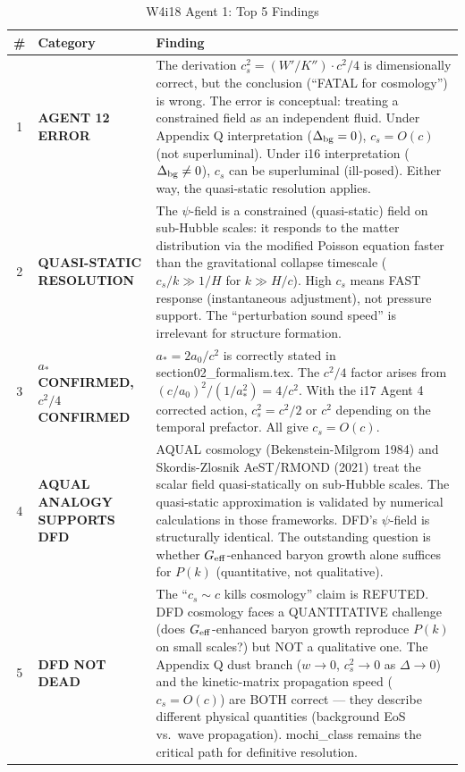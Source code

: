 \documentclass[11pt]{article}
\begin{document}
\begin{table}[H]
\centering
\caption{W4i18 Agent 1: Top 5 Findings}
\begin{tabular}{@{}clp{10cm}@{}}
\toprule
\# & Category & Finding \\
\midrule
1 & \textbf{AGENT 12 ERROR} &
  The derivation $c_s^2 = (W'/K'') \cdot c^2/4$ is dimensionally correct,
  but the conclusion (``FATAL for cosmology'') is wrong. The error is
  conceptual: treating a constrained field as an independent fluid.
  Under Appendix Q interpretation ($\Delta_{\rm bg} = 0$), $c_s = O(c)$
  (not superluminal). Under i16 interpretation ($\Delta_{\rm bg} \neq 0$),
  $c_s$ can be superluminal (ill-posed). Either way, the quasi-static
  resolution applies. \\
\midrule
2 & \textbf{QUASI-STATIC RESOLUTION} &
  The $\psi$-field is a constrained (quasi-static) field on sub-Hubble
  scales: it responds to the matter distribution via the modified
  Poisson equation faster than the gravitational collapse timescale
  ($c_s/k \gg 1/H$ for $k \gg H/c$). High $c_s$ means FAST response
  (instantaneous adjustment), not pressure support. The ``perturbation
  sound speed'' is irrelevant for structure formation. \\
\midrule
3 & \textbf{$a_*$ CONFIRMED, $c^2/4$ CONFIRMED} &
  $a_* = 2a_0/c^2$ is correctly stated in section02\_formalism.tex. The
  $c^2/4$ factor arises from $(c/a_0)^2 / (1/a_*^2) = 4/c^2$. With the
  i17 Agent 4 corrected action, $c_s^2 = c^2/2$ or $c^2$ depending on
  the temporal prefactor. All give $c_s = O(c)$. \\
\midrule
4 & \textbf{AQUAL ANALOGY SUPPORTS DFD} &
  AQUAL cosmology (Bekenstein-Milgrom 1984) and Skordis-Zlosnik
  AeST/RMOND (2021) treat the scalar field quasi-statically on
  sub-Hubble scales. The quasi-static approximation is validated by
  numerical calculations in those frameworks. DFD's $\psi$-field is
  structurally identical. The outstanding question is whether
  $G_{\rm eff}$-enhanced baryon growth alone suffices for $P(k)$
  (quantitative, not qualitative). \\
\midrule
5 & \textbf{DFD NOT DEAD} &
  The ``$c_s \sim c$ kills cosmology'' claim is REFUTED. DFD cosmology
  faces a QUANTITATIVE challenge (does $G_{\rm eff}$-enhanced baryon
  growth reproduce $P(k)$ on small scales?) but NOT a qualitative
  one. The Appendix Q dust branch ($w \to 0$, $c_s^2 \to 0$ as
  $\Delta \to 0$) and the kinetic-matrix propagation speed ($c_s = O(c)$)
  are BOTH correct --- they describe different physical quantities
  (background EoS vs.\ wave propagation). mochi\_class remains the
  critical path for definitive resolution. \\
\bottomrule
\end{tabular}
\end{table}
\end{document}
